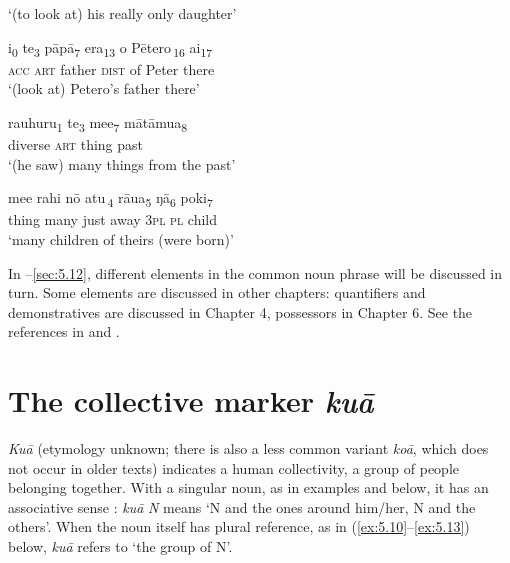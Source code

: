 \glt 
‘(to look at) his really only daughter’ \textstyleExampleref{[Luke 8:41-42]}
\z

\ea\label{ex:5.5}
\gll i\textsubscript{0} te\textsubscript{3} pāpā\textsubscript{7} era\textsubscript{13} {\ob}o Pētero\,{\cb}\textsubscript{16} ai\textsubscript{17}\\
\textsc{acc} \textsc{art} father \textsc{dist} {\db}of Peter there\\

\glt 
‘(look at) Petero’s father there’ \textstyleExampleref{[Notes]}
\z

\ea\label{ex:5.6}
\gll rauhuru\textsubscript{1} te\textsubscript{3} me{\ꞌ}e\textsubscript{7} mātāmu{\ꞌ}a\textsubscript{8}\\
diverse \textsc{art} thing past\\

\glt 
‘(he saw) many things from the past’ \textstyleExampleref{[R423.021]}
\z

\ea\label{ex:5.7}
\gll {\ob}me{\ꞌ}e rahi nō atu\,{\cb}\textsubscript{4} rāua\textsubscript{5} ŋā\textsubscript{6} poki\textsubscript{7}  \\
{\ob}thing many just away \textsc{3pl} \textsc{pl} child  \\

\glt 
‘many children of theirs (were born)’ \textstyleExampleref{[R438.049]} 
\z

In –\ref{sec:5.12}, different elements in the common noun phrase will be discussed in turn. Some elements are discussed in other chapters: quantifiers and demonstratives are discussed in Chapter 4, possessors in Chapter 6. See the references in  and .

\section{The collective marker \textit{kuā}}\label{sec:5.2}
\textit{Kuā} (etymology unknown; there is also a less common variant \textit{koā}, which does not occur in older texts) indicates a human collectivity, a group of people belonging together. With a singular noun, as in examples  and  below, it has an associative sense \citep[50]{Dixon2012}: \textit{kuā} \textit{N} means ‘N and the ones around him/her, N and the others’. When the noun itself has plural reference, as in (\ref{ex:5.10}–\ref{ex:5.13}) below, \textit{kuā} refers to ‘the group of N’.

